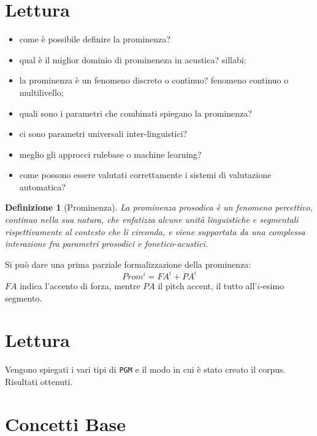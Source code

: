 \documentclass[twoside,twocolumn]{article}
\theoremstyle{definition}
\begin{document}
\section{Lettura \cite{bib:prominence-by-acoustic-analyses}}
	\begin{itemize}
		\item come è possibile definire la prominenza?
		\item qual è il miglior dominio di promineneza in acustica? sillabi;
		\item la prominenza è un fenomeno discreto o continuo? fenomeno continuo o multilivello;
		\item quali sono i parametri che combinati spiegano la prominenza? 
		\item ci sono parametri universali inter-linguistici?
		\item meglio gli approcci rulebase o machine learning?
		\item come possono essere valutati correttamente i sistemi di valutazione automatica?
	\end{itemize}
	\theoremstyle{plain}
	\newtheorem{definition}{Definizione}
	\begin{definition}[Prominenza]\label{def:prosodic-prominency}
		La prominenza prosodica è un fenomeno percettivo, continuo nella sua natura, che enfatizza alcune unità linguistiche e segmentali rispettivamente al contesto che li circonda, e viene supportata da una complessa interazione fra parametri prosodici e fonetico-acustici.
	\end{definition}

	Si può dare una prima parziale formalizzazione della prominenza:
	\begin{equation}
		\label{eq:prom}
		Prom^i = FA^i + PA^i
	\end{equation}
	$FA$ indica l'accento di forza, mentre $PA$ il pitch accent, il tutto all'$i$-esimo segmento.

\section{Lettura \cite{bib:prominence-detection-italian}}
	Vengono spiegati i vari tipi di \texttt{PGM} e il modo in cui è stato creato il corpus. Risultati ottenuti.

\section{Concetti Base}
\end{document}
